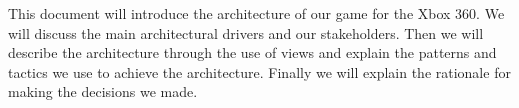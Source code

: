 This document will introduce the architecture of our
game for the Xbox 360.  We will discuss the main architectural drivers and our
stakeholders.  Then we will describe the architecture through the use of views
and explain the patterns and tactics we use to achieve the architecture.  
Finally we will explain the rationale for making the decisions we made.
